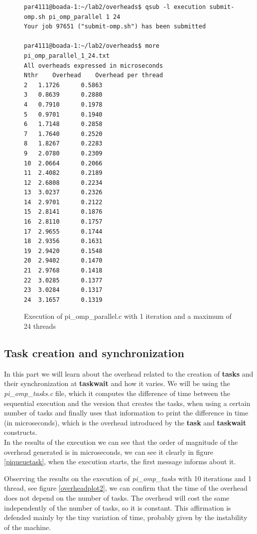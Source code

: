 \documentclass[12]{article}
\begin{document}
\begin{figure}[H]
\begin{lstlisting}[frame=single]
par4111@boada-1:~/lab2/overheads$ qsub -l execution submit-omp.sh pi_omp_parallel 1 24
Your job 97651 ("submit-omp.sh") has been submitted

par4111@boada-1:~/lab2/overheads$ more pi_omp_parallel_1_24.txt 
All overheads expressed in microseconds
Nthr	Overhead	Overhead per thread
2	1.1726		0.5863
3	0.8639		0.2880
4	0.7910		0.1978
5	0.9701		0.1940
6	1.7148		0.2858
7	1.7640		0.2520
8	1.8267		0.2283
9	2.0780		0.2309
10	2.0664		0.2066
11	2.4082		0.2189
12	2.6808		0.2234
13	3.0237		0.2326
14	2.9701		0.2122
15	2.8141		0.1876
16	2.8110		0.1757
17	2.9655		0.1744
18	2.9356		0.1631
19	2.9420		0.1548
20	2.9402		0.1470
21	2.9768		0.1418
22	3.0285		0.1377
23	3.0284		0.1317
24	3.1657		0.1319

\end{lstlisting}
\caption{Execution of pi\_omp\_parallel.c with 1 iteration and a maximum of 24 threads}
\label{piqueue}
\end{figure}
\subsection{Task creation and synchronization}
In this part we will learn about the overhead related to the creation of \textbf{tasks} and their synchronization at \textbf{taskwait} and how it varies. We will be using the \textit{pi\_omp\_tasks.c} file, which it computes the difference of time between the sequential execution and the version that creates the tasks, when using a certain number of tasks and finally uses that information to print the difference in time (in microseconds), which is the overhead introduced by the \textbf{task} and \textbf{taskwait} constructs. 
\\
\medskip
In the results of the execution we can see that the order of magnitude of the overhead generated is in microseconds, we can see it clearly in figure \ref{piqueuetask}, when the 
execution starts, the first message informs about it. 
\\
\medskip

Observing the results on the execution of \textit{pi\_omp\_tasks} with 10 iterations and 1 thread, see figure \ref{overheadplot2}, we can confirm that the time of the overhead does not depend on the number of tasks. The overhead will cost the same independently of the number of tasks, so it is constant. This affirmation is defended mainly by the tiny variation of time, probably given by the instability of the machine. 
\\
\bigskip
\end{document}
